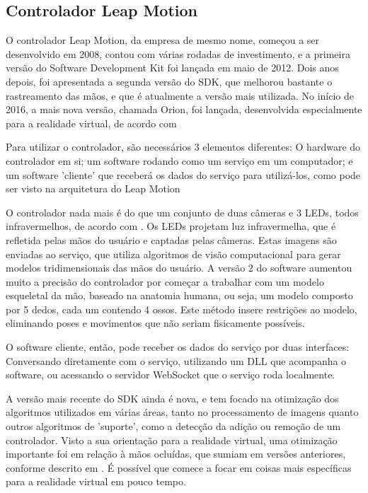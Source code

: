 \subsection{Controlador Leap Motion}\label{subsubsec-teo-leap-motion}

O controlador Leap Motion, da empresa de mesmo nome, começou a ser desenvolvido 
em 2008, contou com várias rodadas de investimento, e a primeira versão do 
Software Development Kit foi lançada em maio de 2012. Dois anos depois, foi 
apresentada a segunda versão do SDK, que melhorou bastante o rastreamento das 
mãos, e que é atualmente a versão mais utilizada. No início de 2016, a mais 
nova versão, chamada Orion, foi lançada, desenvolvida especialmente para a 
realidade virtual, de acordo com \cite{leap:2016:changeset}

Para utilizar o controlador, são necessários 3 elementos diferentes: O hardware 
do controlador em si; um software rodando como um serviço em um computador; 
e um software 'cliente' que receberá os dados do serviço para utilizá-los, 
como pode ser visto na arquitetura do Leap Motion \cite{leap:2016:architecture}

O controlador nada mais é do que um conjunto de duas câmeras e 3 LEDs, todos 
infravermelhos, de acordo com \cite{leap:2016:how-it-works}. Os LEDs projetam
luz infravermelha, que é refletida pelas mãos do usuário e captadas 
pelas câmeras. Estas imagens são enviadas ao serviço, 
que utiliza algoritmos de visão computacional para gerar modelos tridimensionais 
das mãos do usuário. A versão 2 do software aumentou muito a precisão do 
controlador por começar a trabalhar com um modelo esqueletal da mão, baseado 
na anatomia humana, ou seja, um modelo composto por 5 dedos, cada um contendo 
4 ossos. Este método insere restrições ao modelo, eliminando poses e movimentos 
que não seriam fisicamente possíveis.

O software cliente, então, pode receber os dados do serviço por duas interfaces:
Conversando diretamente com o serviço, utilizando um DLL que acompanha o software, 
ou acessando o servidor WebSocket que o serviço roda localmente.

A versão mais recente do SDK ainda é nova, e tem focado na otimização dos 
algoritmos utilizados em várias áreas, tanto no processamento de imagens quanto 
outros algoritmos de 'suporte', como a detecção da adição ou remoção de um 
controlador. Visto a sua orientação para a realidade virtual, uma otimização 
importante foi em relação à mãos ocluídas, que sumiam em versões anteriores, 
conforme descrito em \cite{leap:2016:changeset}. É possível que comece a focar 
em coisas mais específicas para a realidade virtual em pouco tempo.

